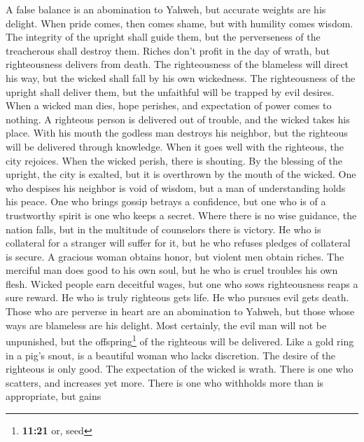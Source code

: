  A false balance is an abomination to Yahweh, but accurate
weights are his delight.  When pride comes, then comes
shame, but with humility comes wisdom.  The integrity of
the upright shall guide them, but the perverseness of the treacherous
shall destroy them.  Riches don't profit in the day of
wrath, but righteousness delivers from death.  The
righteousness of the blameless will direct his way, but the wicked shall
fall by his own wickedness.  The righteousness of the
upright shall deliver them, but the unfaithful will be trapped by evil
desires.  When a wicked man dies, hope perishes, and
expectation of power comes to nothing.  A righteous person
is delivered out of trouble, and the wicked takes his place.
 With his mouth the godless man destroys his neighbor, but
the righteous will be delivered through knowledge.  When
it goes well with the righteous, the city rejoices. When the wicked
perish, there is shouting.  By the blessing of the
upright, the city is exalted, but it is overthrown by the mouth of the
wicked.  One who despises his neighbor is void of wisdom,
but a man of understanding holds his peace.  One who
brings gossip betrays a confidence, but one who is of a trustworthy
spirit is one who keeps a secret.  Where there is no wise
guidance, the nation falls, but in the multitude of counselors there is
victory.  He who is collateral for a stranger will suffer
for it, but he who refuses pledges of collateral is secure.
 A gracious woman obtains honor, but violent men obtain
riches.  The merciful man does good to his own soul, but
he who is cruel troubles his own flesh.  Wicked people
earn deceitful wages, but one who sows righteousness reaps a sure
reward.  He who is truly righteous gets life. He who
pursues evil gets death.  Those who are perverse in heart
are an abomination to Yahweh, but those whose ways are blameless are his
delight.  Most certainly, the evil man will not be
unpunished, but the offspring\footnote{\textbf{11:21} or, seed} of the
righteous will be delivered.  Like a gold ring in a pig's
snout, is a beautiful woman who lacks discretion.  The
desire of the righteous is only good. The expectation of the wicked is
wrath.  There is one who scatters, and increases yet
more. There is one who withholds more than is appropriate, but gains
